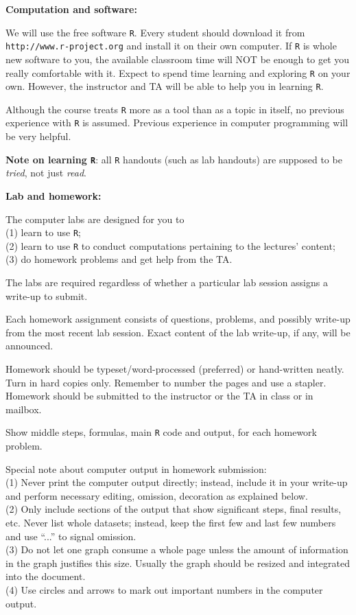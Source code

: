 \documentclass{article}
\begin{document}
\bigskip
\textbf{\large Computation and software:}

We will use the free software \texttt{R}.
Every student should download it from
\texttt{http://www.r-project.org} and install it on their own computer.
If \texttt{R} is whole new software to you,
the available classroom time will NOT be enough to get you really
comfortable with it.
Expect to spend time learning and exploring \texttt{R} on your own.
However, the instructor and TA will be able to help you in learning
\texttt{R}.

Although the course treats \texttt{R}
more as a tool than as a topic in itself,
no previous experience with \texttt{R} is assumed.
Previous experience in computer programming will be very helpful.

\textbf{Note on learning \texttt{R}}:
all \texttt{R} handouts (such as lab handouts) are supposed to
be \emph{tried}, not just \emph{read}.


\bigskip
\textbf{\large Lab and homework:}

The computer labs are designed for you to\\
(1) learn to use \texttt{R};\\
(2) learn to use \texttt{R} to conduct computations pertaining to
the lectures' content;\\
(3) do homework problems and get help from the TA.

The labs are required regardless of whether a particular lab session
assigns a write-up to submit.

Each homework assignment consists of questions, problems,
and possibly write-up from the most recent lab session.
Exact content of the lab write-up, if any,
will be announced.

Homework should be typeset/word-processed (preferred) or hand-written neatly.
Turn in hard copies only. Remember to number the pages and use a stapler.
Homework should be submitted to the instructor or the TA
in class or in mailbox.

Show middle steps, formulas, main \texttt{R} code and output,
for each homework problem.

Special note about computer output in homework submission:\\
(1) Never print the computer output directly; instead, include it in
your write-up and perform necessary editing, omission, decoration as
explained below.\\
(2) Only include sections of the output that show significant steps, final
results, etc. Never list whole datasets; instead, keep the first few and
last few numbers and use ``...'' to signal omission.\\
(3) Do not let one graph consume a whole page unless the amount of
information in the graph justifies this size. Usually the graph should
be resized and integrated into the document.\\
(4) Use circles and arrows to mark out important numbers in the computer output.
\end{document}
